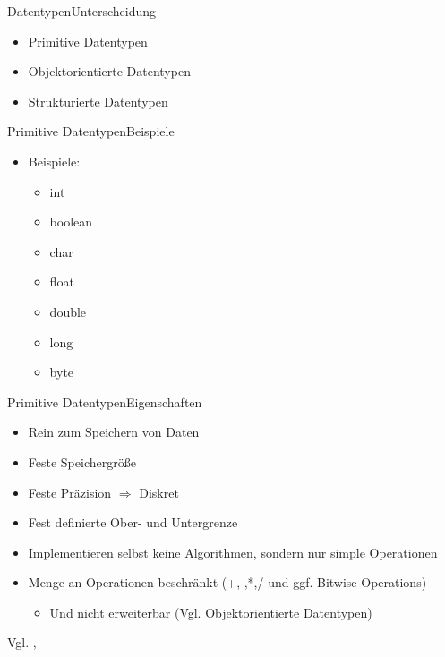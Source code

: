\begin{frame}{Datentypen}{Unterscheidung}
    \begin{itemize}
        \item Primitive Datentypen
        \item Objektorientierte Datentypen
        \item Strukturierte Datentypen
    \end{itemize}
\end{frame}

\begin{frame}{Primitive Datentypen}{Beispiele}
    \begin{itemize}
    \item Beispiele:
        \begin{itemize}
            \item int
            \item boolean
            \item char
            \item float
            \item double
            \item long
            \item byte
        \end{itemize}
    \end{itemize}
\end{frame}

\begin{frame}{Primitive Datentypen}{Eigenschaften}
    \begin{itemize}
        \item Rein zum Speichern von Daten
        \item Feste Speichergröße
        \item Feste Präzision $\Rightarrow$ Diskret
        \item Fest definierte Ober- und Untergrenze
        \item Implementieren selbst keine Algorithmen, sondern nur simple Operationen
        \item Menge an Operationen beschränkt (+,-,*,/ und ggf. Bitwise Operations)
        \begin{itemize}
            \item Und nicht erweiterbar (Vgl. Objektorientierte Datentypen)
        \end{itemize}
    \end{itemize}
    Vgl. \cite{wiki:primdt}, \cite{orac:primdt}
\end{frame}

